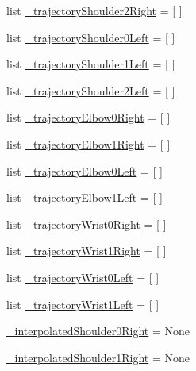 \begin{DoxyCompactItemize}
\item 
list \mbox{\hyperlink{namespacesteering__response__test_a20df007de9379534b0ceef85002a4fbd}{\+\_\+trajectory\+Shoulder2\+Right}} = \mbox{[} \mbox{]}
\item 
list \mbox{\hyperlink{namespacesteering__response__test_aa0085aa374c8a12e5308301dbeee5f5a}{\+\_\+trajectory\+Shoulder0\+Left}} = \mbox{[} \mbox{]}
\item 
list \mbox{\hyperlink{namespacesteering__response__test_a60138d8f146264a265af058e753550db}{\+\_\+trajectory\+Shoulder1\+Left}} = \mbox{[} \mbox{]}
\item 
list \mbox{\hyperlink{namespacesteering__response__test_af251eed502a394f28c42dc88580bb9d8}{\+\_\+trajectory\+Shoulder2\+Left}} = \mbox{[} \mbox{]}
\item 
list \mbox{\hyperlink{namespacesteering__response__test_a94f4e39016ced38231a867f8526db02e}{\+\_\+trajectory\+Elbow0\+Right}} = \mbox{[} \mbox{]}
\item 
list \mbox{\hyperlink{namespacesteering__response__test_a1df4ff7e16fd8845bf7dcf78a8310b77}{\+\_\+trajectory\+Elbow1\+Right}} = \mbox{[} \mbox{]}
\item 
list \mbox{\hyperlink{namespacesteering__response__test_a0efc7a2be0177ff121cb37947afc28f1}{\+\_\+trajectory\+Elbow0\+Left}} = \mbox{[} \mbox{]}
\item 
list \mbox{\hyperlink{namespacesteering__response__test_a3a85f114e66039db1ba18997f09f0a73}{\+\_\+trajectory\+Elbow1\+Left}} = \mbox{[} \mbox{]}
\item 
list \mbox{\hyperlink{namespacesteering__response__test_a16f1f96dfa226dc785cbaaec9575819a}{\+\_\+trajectory\+Wrist0\+Right}} = \mbox{[} \mbox{]}
\item 
list \mbox{\hyperlink{namespacesteering__response__test_a1d79daa26919f94b76956dafafb4da73}{\+\_\+trajectory\+Wrist1\+Right}} = \mbox{[} \mbox{]}
\item 
list \mbox{\hyperlink{namespacesteering__response__test_a69eea752e11ee98b6889cb3520cb9ade}{\+\_\+trajectory\+Wrist0\+Left}} = \mbox{[} \mbox{]}
\item 
list \mbox{\hyperlink{namespacesteering__response__test_a8b27ad7c3027661241d9ba339719c6c3}{\+\_\+trajectory\+Wrist1\+Left}} = \mbox{[} \mbox{]}
\item 
\mbox{\hyperlink{namespacesteering__response__test_ae915ad782422539e78777a2fe9e1a140}{\+\_\+interpolated\+Shoulder0\+Right}} = None
\item 
\mbox{\hyperlink{namespacesteering__response__test_a8fa5737418e18178da808050ed5b4955}{\+\_\+interpolated\+Shoulder1\+Right}} = None

\end{DoxyCompactItemize}
